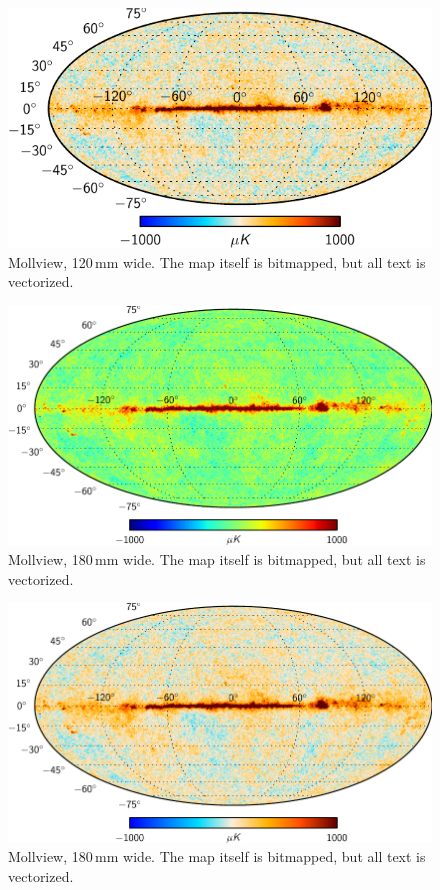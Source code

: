 \documentclass[traditabstract]{aa}
\begin{document}
\begin{figure}[ht]
\sidecaption
\includegraphics[width=12cm]{PlanckFig_map_colombi1_python_120mm}
\caption{Mollview, 120\,mm wide.  The map itself is bitmapped, but all text is vectorized.} 
\label{fig:map_parchment_python120}
\end{figure}



\begin{figure}[H!b]
\includegraphics[width=18cm]{PlanckFig_map_python_180mm}
\caption{Mollview, 180\,mm wide.  The map itself is bitmapped, but all text is vectorized.}
\label{fig:map_python180}
\end{figure}

\begin{figure}[H!b]
\includegraphics[width=18cm]{PlanckFig_map_colombi1_python_180mm}
\caption{Mollview, 180\,mm wide.  The map itself is bitmapped, but all text is vectorized.}
\label{fig:map_parchment_python180}
\end{figure}
\end{document}
